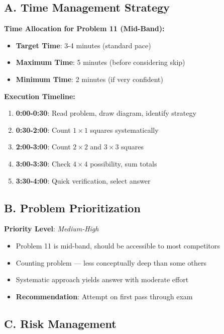 \documentclass[12pt]{article}
\begin{document}
\begin{competitionbox}
\subsection*{A. Time Management Strategy}

\textbf{Time Allocation for Problem 11 (Mid-Band):}
\begin{itemize}
    \item \textbf{Target Time}: 3-4 minutes (standard pace)
    \item \textbf{Maximum Time}: 5 minutes (before considering skip)
    \item \textbf{Minimum Time}: 2 minutes (if very confident)
\end{itemize}

\textbf{Execution Timeline:}
\begin{enumerate}
    \item \textbf{0:00-0:30}: Read problem, draw diagram, identify strategy
    \item \textbf{0:30-2:00}: Count $1 \times 1$ squares systematically
    \item \textbf{2:00-3:00}: Count $2 \times 2$ and $3 \times 3$ squares
    \item \textbf{3:00-3:30}: Check $4 \times 4$ possibility, sum totals
    \item \textbf{3:30-4:00}: Quick verification, select answer
\end{enumerate}

\subsection*{B. Problem Prioritization}

\textbf{Priority Level}: \textit{Medium-High}
\begin{itemize}
    \item Problem 11 is mid-band, should be accessible to most competitors
    \item Counting problem — less conceptually deep than some others
    \item Systematic approach yields answer with moderate effort
    \item \textbf{Recommendation}: Attempt on first pass through exam
\end{itemize}

\subsection*{C. Risk Management}


\end{competitionbox}
\end{document}
